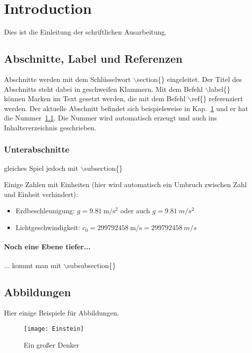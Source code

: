 \chapter{Introduction} \label{chap:introduction}
Dies ist die Einleitung der schriftlichen Ausarbeitung.

\section{Abschnitte, Label und Referenzen} \label{sec:abschnitte}
Abschnitte werden mit dem Schlüsselwort $\backslash$section\{\} eingeleitet. Der Titel des Abschnitts steht dabei in geschweifen Klammern. Mit dem Befehl $\backslash$label\{\} können Marken im Text gesetzt werden, die mit dem Befehl $\backslash$ref\{\} referenziert werden. Der aktuelle Abschnitt befindet sich beispielsweise in Kap.~\ref{chap:introduction} und er hat die Nummer~\ref{sec:abschnitte}. Die Nummer wird automatisch erzeugt und auch ins Inhaltsverzeichnis geschrieben.

\subsection{Unterabschnitte}
gleiches Spiel jedoch mit $\backslash$subsection\{\}

Einige Zahlen mit Einheiten (hier wird automatisch ein Umbruch zwischen Zahl und Einheit verhindert):
\begin{itemize}
	\item Erdbeschleunigung: $g = \SI{9.81}{\meter\per\second\squared}$ oder auch $g = \SI{9.81}{m/s^{2}}$
    \item Lichtgeschwindigkeit: $c_0 = \SI{299792458}{\meter\per\second} = \SI{299792458}{m/s}$
\end{itemize}


\subsubsection{Noch eine Ebene tiefer...}
... kommt man mit $\backslash$subsubsection\{\}

\section{Abbildungen}
Hier einige Beispiele für Abbildungen.
\begin{figure}[htb]
	\centering
		\texttt{[image: Einstein]}
	\caption{Ein großer Denker}
	\label{fig:Einstein}
\end{figure}


